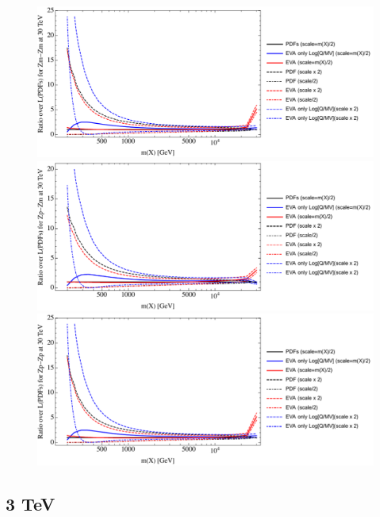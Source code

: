 \documentclass[a4paper,11pt]{article}
\begin{document}
\begin{figure}[ht]
\includegraphics[width=0.46\linewidth]{PlotLumi/30TeV/ratios/Zm-Zm.pdf}
\includegraphics[width=0.46\linewidth]{PlotLumi/30TeV/ratios/Zp-Zm.pdf}
\includegraphics[width=0.46\linewidth]{PlotLumi/30TeV/ratios/Zp-Zp.pdf}
\end{figure}

%
%

\clearpage
\subsection{3 TeV}
\end{document}
